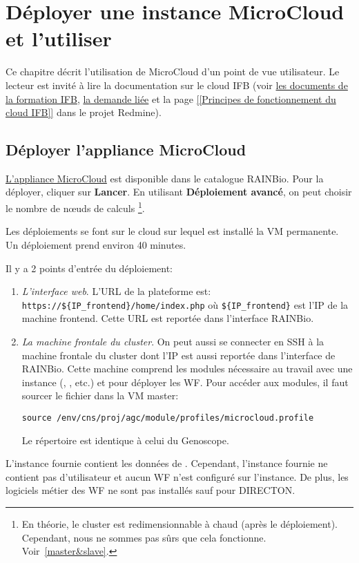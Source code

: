 \chapter{Déployer une instance MicroCloud et l'utiliser} \label{chap:deploiement}

Ce chapitre décrit l'utilisation de MicroCloud d'un point de vue utilisateur.
Le lecteur est invité à lire la documentation sur le cloud IFB
(voir \href{https://intranet.genoscope.cns.fr/agc/redmine/documents/86}{les documents de la formation IFB},
\href{https://intranet.genoscope.cns.fr/agc/redmine/issues/6010}{la demande liée}
et la page \href{https://intranet.genoscope.cns.fr/agc/redmine/projects/microcloud/wiki/Principes_de_fonctionnement_du_cloud_IFB}{[[Principes de fonctionnement du cloud IFB]]}
dans le projet Redmine).

\section{Déployer l'appliance MicroCloud}

\href{https://biosphere.france-bioinformatique.fr/catalogue/appliance/150/}{L'appliance MicroCloud} est disponible dans le catalogue RAINBio.
Pour la déployer, cliquer sur \textbf{Lancer}.
En utilisant \textbf{Déploiement avancé}, on peut choisir le nombre de nœuds de calculs
\footnote{En théorie, le cluster est redimensionnable à chaud (après le déploiement). Cependant, nous ne sommes pas sûrs que cela fonctionne. Voir~\autoref{master&slave}.}.

Les déploiements se font sur le cloud  sur lequel est installé la VM permanente.
Un déploiement prend environ 40 minutes.


Il y a 2 points d'entrée du déploiement:
\begin{enumerate}
    \item \emph{L'interface web}. L'URL de la plateforme est: \nolinkurl{https://${IP_frontend}/home/index.php} où \nolinkurl{${IP_frontend}}
          est l'IP de la machine frontend.
          Cette URL est reportée dans l'interface RAINBio.
    \item \emph{La machine frontale du cluster}. On peut aussi se connecter en SSH à la machine frontale du cluster
          dont l'IP est aussi reportée dans l'interface de RAINBio.
          Cette machine comprend les modules nécessaire au travail avec une instance (, , etc.)
          et  pour déployer les WF.
          Pour accéder aux modules, il faut sourcer le fichier  dans la VM master:
          \begin{lstlisting}[style=bash,gobble=14]
              source /env/cns/proj/agc/module/profiles/microcloud.profile
          \end{lstlisting}
            Le répertoire  est identique à celui du Genoscope.
\end{enumerate}
L'instance fournie contient les données de \theOrg{}.
Cependant, l'instance fournie ne contient pas d'utilisateur
et aucun WF n'est configuré sur l'instance.
De plus, les logiciels métier des WF ne sont pas installés
sauf pour DIRECTON.

